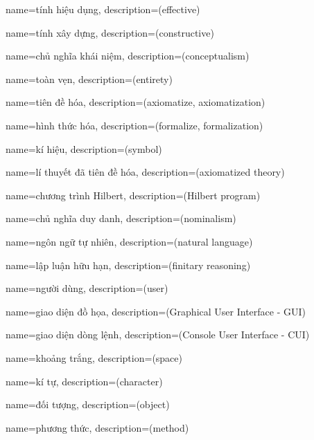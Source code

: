 {
    name={tính hiệu dụng},
    description={(effective)}
}

{
    name={tính xây dựng},
    description={(constructive)}
}

{
    name={chủ nghĩa khái niệm},
    description={(conceptualism)}
}

{
    name={toàn vẹn},
    description={(entirety)}
}

{
    name={tiên đề hóa},
    description={(axiomatize, axiomatization)}
}

{
    name={hình thức hóa},
    description={(formalize, formalization)}
}

{
    name={kí hiệu},
    description={(symbol)}
}

{
    name={lí thuyết đã tiên đề hóa},
    description={(axiomatized theory)}
}

{
    name={chương trình Hilbert},
    description={(Hilbert program)}
}

{
    name={chủ nghĩa duy danh},
    description={(nominalism)}
}

{
    name={ngôn ngữ tự nhiên},
    description={(natural language)}
}

{
    name={lập luận hữu hạn},
    description={(finitary reasoning)}
}

{
    name={người dùng},
    description={(user)}
}

{
    name={giao diện đồ họa},
    description={(Graphical User Interface - GUI)}
}

{
    name={giao diện dòng lệnh},
    description={(Console User Interface - CUI)}
}

{
    name={khoảng trắng},
    description={(space)}
}

{
    name={kí tự},
    description={(character)}
}

{
    name={đối tượng},
    description={(object)}
}

{
    name={phương thức},
    description={(method)}
}

